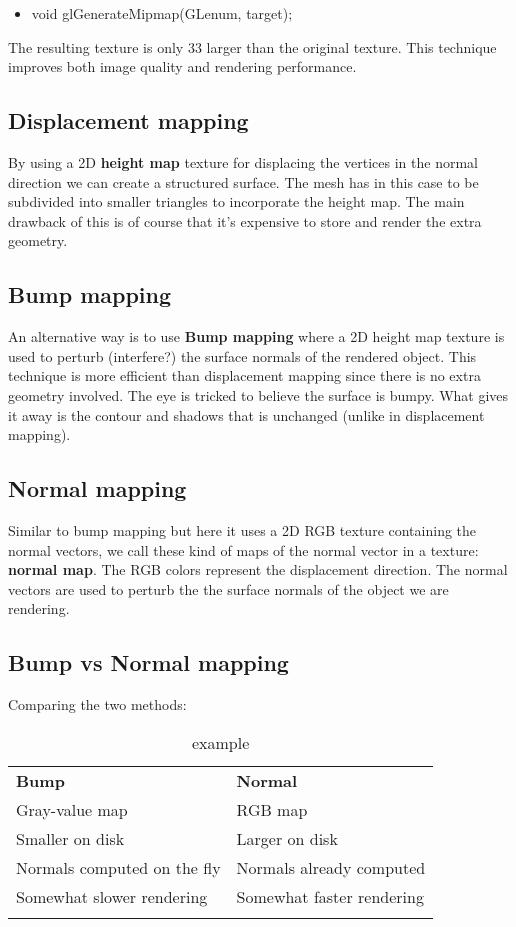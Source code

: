 	 \begin{itemize}
	 	\item void glGenerateMipmap(GLenum, target);
	 \end{itemize}

	 The resulting texture is only 33  larger than the original texture. This technique improves both image quality and rendering performance. 


	 \subsection*{Displacement mapping}
	 By using a 2D \textbf{height map} texture for displacing the vertices in the normal direction we can create a structured surface. The mesh has in this case to be subdivided into smaller triangles to incorporate the height map. The main drawback of this is of course that it's expensive to store and render the extra geometry.

	 \subsection*{Bump mapping}
	  An alternative way is to use \textbf{Bump mapping} where a 2D height map texture is used to perturb (interfere?) the surface normals of the rendered object. This technique is more efficient than displacement mapping since there is no extra geometry involved. The eye is tricked to believe the surface is bumpy. What gives it away is the contour and shadows that is unchanged (unlike in displacement mapping).

	  \subsection*{Normal mapping}
	  Similar to bump mapping but here it uses a 2D RGB texture containing the normal vectors, we call these kind of maps of the normal vector in a texture: \textbf{normal map}. The RGB colors represent the displacement direction. 
	  The normal vectors are used to perturb the the surface normals of the object we are rendering.  
	 

	  \subsection*{Bump vs Normal mapping}
	  Comparing the two methods: 
		  \begin{table}[ht!]
		  \centering
		  \begin{tabular}{ll}\hline
		   \textbf{Bump}&    \textbf{Normal}\\
		   Gray-value map&   RGB map \\
		   Smaller on disk&   Larger on disk\\ 
		   Normals computed on the fly& Normals already computed\\
		   Somewhat slower rendering& Somewhat faster rendering\\
		   & \\ \hline
		  \end{tabular}
		  \caption{example}
		  \label{tab:tab1}
		  \end{table}


